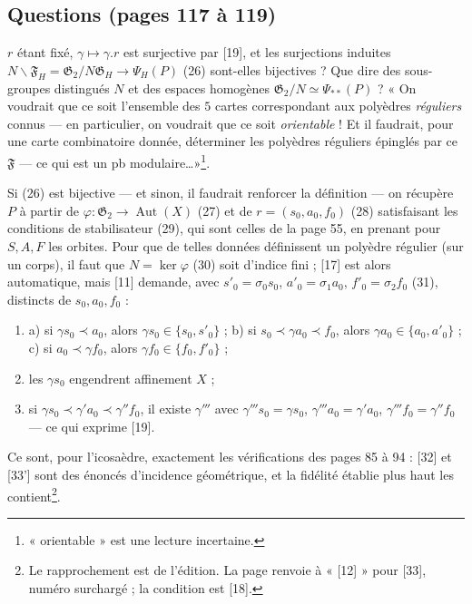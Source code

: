 \documentclass[11pt,a4paper]{article}
\begin{document}
\subsection*{Questions (pages 117 à 119)}

$r$ étant fixé, $\gamma \mapsto \gamma.r$ est surjective par [19], et les
surjections induites $N \backslash \mathfrak{F}_H = \mathfrak{G}_2 / N\mathfrak{G}_H
\to \Psi_H(P)$ (26) sont-elles bijectives ? Que dire des sous-groupes
distingués $N$ et des espaces homogènes $\mathfrak{G}_2 / N \simeq \Psi_{**}(P)$ ?
« On voudrait que ce soit l'ensemble des $5$ cartes correspondant aux polyèdres
\emph{réguliers} connus --- en particulier, on voudrait que ce soit
\emph{orientable} ! Et il faudrait, pour une carte combinatoire donnée,
déterminer les polyèdres réguliers épinglés par ce $\mathfrak{F}$ --- ce qui est
un pb modulaire\ldots »\footnote{« orientable » est une lecture incertaine.}.

Si (26) est bijective --- et sinon, il faudrait renforcer la définition --- on
récupère $P$ à partir de $\varphi : \mathfrak{G}_2 \to \operatorname{Aut}(X)$ (27) et
de $r = (s_0, a_0, f_0)$ (28) satisfaisant les conditions de stabilisateur (29),
qui sont celles de la page 55, en prenant pour $S, A, F$ les orbites. Pour
que de telles données définissent un polyèdre régulier (sur un corps), il faut
que $N = \ker\varphi$ (30) soit d'indice fini ; [17] est alors automatique,
mais [11] demande, avec $s'_0 = \sigma_0 s_0$, $a'_0 = \sigma_1 a_0$, $f'_0 =
\sigma_2 f_0$ (31), distincts de $s_0, a_0, f_0$ :
\begin{enumerate}
  \item[{[32]}] a) si $\gamma s_0 \prec a_0$, alors $\gamma s_0 \in \{s_0, s'_0\}$
    ; b) si $s_0 \prec \gamma a_0 \prec f_0$, alors $\gamma a_0 \in \{a_0,
    a'_0\}$ ; c) si $a_0 \prec \gamma f_0$, alors $\gamma f_0 \in \{f_0, f'_0\}$ ;
  \item[{[33]}] les $\gamma s_0$ engendrent affinement $X$ ;
  \item[{[33']}] si $\gamma s_0 \prec \gamma' a_0 \prec \gamma'' f_0$, il existe
    $\gamma'''$ avec $\gamma''' s_0 = \gamma s_0$, $\gamma''' a_0 = \gamma' a_0$,
    $\gamma''' f_0 = \gamma'' f_0$ --- ce qui exprime [19].
\end{enumerate}
Ce sont, pour l'icosaèdre, exactement les vérifications des pages 85 à 94 :
[32] et [33'] sont des énoncés d'incidence géométrique, et la fidélité établie
plus haut les contient\footnote{Le rapprochement est de l'édition. La page
renvoie à « [12] » pour [33], numéro surchargé ; la condition est [18].}.
\end{document}
